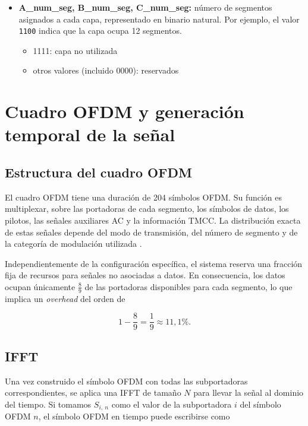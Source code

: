 \begin{itemize}
\item \textbf{A\_num\_seg, B\_num\_seg, C\_num\_seg:} número de segmentos asignados a cada capa, representado en binario natural. Por ejemplo, el valor \texttt{1100} indica que la capa ocupa 12 segmentos.
\begin{itemize}
\item 1111: capa no utilizada
\item otros valores (incluido 0000): reservados
\end{itemize}

\end{itemize}


\section{Cuadro OFDM y generación temporal de la señal}

\subsection{Estructura del cuadro OFDM}

El cuadro OFDM tiene una duración de 204 símbolos OFDM. Su función es multiplexar, sobre las portadoras de cada segmento, los símbolos de datos, los pilotos, las señales auxiliares AC y la información TMCC. La distribución exacta de estas señales depende del modo de transmisión, del número de segmento y de la categoría de modulación utilizada \cite{isdbt,portugues}.

Independientemente de la configuración específica, el sistema reserva una fracción fija de recursos para señales no asociadas a datos. En consecuencia, los datos ocupan únicamente $\frac{8}{9}$ de las portadoras disponibles para cada segmento, lo que implica un \textit{overhead} del orden de

\begin{equation}
1-\frac89 = \frac19 \approx 11{,}1\%.
\end{equation}

\subsection{IFFT}

Una vez construido el símbolo OFDM con todas las subportadoras correspondientes, se aplica una IFFT de tamaño $N$ para llevar la señal al dominio del tiempo. Si tomamos $S_{i,\ n}$ como el valor de la subportadora $i$ del símbolo OFDM $n$, el símbolo OFDM en tiempo puede escribirse como

